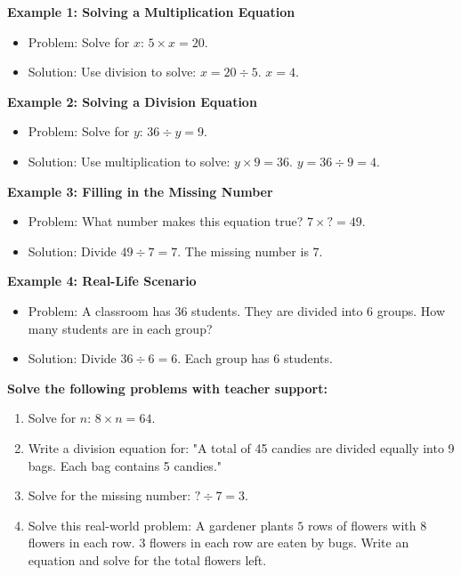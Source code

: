 \documentclass[11pt]{article}
\begin{document}
\begin{tcolorbox}[colframe=black!60, colback=white, 
coltitle=black, colbacktitle=black!15, fonttitle=\bfseries\Large, 
title=Examples, halign title=center, left=10pt, right=10pt, top=10pt, bottom=15pt]
\textbf{Example 1: Solving a Multiplication Equation}
\begin{itemize}
    \item Problem: Solve for \(x\): \(5 \times x = 20\).
    \item Solution: Use division to solve: \(x = 20 \div 5\). \(x = 4\).
\end{itemize}

\textbf{Example 2: Solving a Division Equation}
\begin{itemize}
    \item Problem: Solve for \(y\): \(36 \div y = 9\).
    \item Solution: Use multiplication to solve: \(y \times 9 = 36\). \(y = 36 \div 9 = 4\).
\end{itemize}

\textbf{Example 3: Filling in the Missing Number}
\begin{itemize}
    \item Problem: What number makes this equation true? \(7 \times ? = 49\).
    \item Solution: Divide \(49 \div 7 = 7\). The missing number is \(7\).
\end{itemize}

\textbf{Example 4: Real-Life Scenario}
\begin{itemize}
    \item Problem: A classroom has \(36\) students. They are divided into \(6\) groups. How many students are in each group?
    \item Solution: Divide \(36 \div 6 = 6\). Each group has \(6\) students.
\end{itemize}
\end{tcolorbox}

\vspace{1em}

\begin{tcolorbox}[colframe=black!60, colback=white, 
coltitle=black, colbacktitle=black!15, fonttitle=\bfseries\Large, 
title=Guided Practice, halign title=center, left=10pt, right=10pt, top=10pt, bottom=15pt]
\textbf{Solve the following problems with teacher support:}
\begin{enumerate}[itemsep=5em] %
    \item Solve for \(n\): \(8 \times n = 64\).
    \item Write a division equation for: "A total of 45 candies are divided equally into 9 bags. Each bag contains 5 candies."
    \item Solve for the missing number: \(? \div 7 = 3\).
    \item Solve this real-world problem: A gardener plants \(5\) rows of flowers with \(8\) flowers in each row. \(3\) flowers in each row are eaten by bugs. Write an equation and solve for the total flowers left.
\end{enumerate}
\end{tcolorbox}
\end{document}
